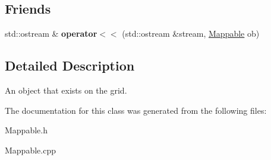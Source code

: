 \subsection*{Friends}
\begin{DoxyCompactItemize}
\item 
\hypertarget{classMappable_a0b57649bb1e7774386e133f026d60176}{
std::ostream \& {\bfseries operator$<$$<$} (std::ostream \&stream, \hyperlink{classMappable}{Mappable} ob)}
\label{classMappable_a0b57649bb1e7774386e133f026d60176}

\end{DoxyCompactItemize}


\subsection{Detailed Description}
An object that exists on the grid. 

The documentation for this class was generated from the following files:\begin{DoxyCompactItemize}
\item 
Mappable.h\item 
Mappable.cpp\end{DoxyCompactItemize}
